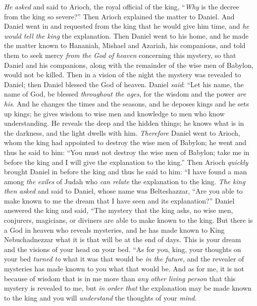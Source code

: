 \begin{biblechapter}
\verse \textit{He asked} and said to Arioch, the royal official of the king, “\textit{Why} is the decree from the king so severe?” Then Arioch explained the matter to Daniel.
\verse And Daniel went in and requested from the king that he would give him time, and \textit{he would tell the king} the explanation.
\verse Then Daniel went to his home, and he made the matter known to Hananiah, Mishael and Azariah, his companions,
\verse and told them to seek mercy \textit{from the God of heaven} concerning this mystery, so that Daniel and his companions, along with the remainder of the wise men of Babylon, would not be killed.
\verse Then in a vision of the night the mystery was revealed to Daniel; then Daniel blessed the God of heaven.
\verse Daniel \textit{said}:
\verse “Let his name, the name of God, be blessed \textit{throughout the ages}, 
for the wisdom and the power \textit{are his}.
\verse And he changes the times and the seasons, 
and he deposes kings and he sets up kings; 
he gives wisdom to wise men 
and knowledge to men who know understanding.
\verse He reveals the deep and the hidden things; 
he knows what is in the darkness, 
and the light dwells with him.
 \textit{Therefore} Daniel went to Arioch, whom the king had appointed to destroy the wise men of Babylon; he went and thus he said to him: “You must not destroy the wise men of Babylon; take me in before the king and I will give the explanation to the king.”
\verse Then Arioch \textit{quickly} brought Daniel in before the king and thus he said to him: “I have found a man among \textit{the exiles} of Judah who \textit{can relate} the explanation to the king.
\verse \textit{The king then asked} and said to Daniel, whose name was Belteshazzar, “Are you able to make known to me the dream that I have seen and its explanation?”
\verse Daniel answered the king and said, “The mystery that the king asks, no wise men, conjurers, magicians, or diviners are able to make known to the king.
\verse But there is a God in heaven who reveals mysteries, and he has made known to King Nebuchadnezzar what it is that will be at the end of days. This is your dream and the visions of your head on your bed.
\verse “As for you, king, your thoughts on your bed \textit{turned to} what it was that would be \textit{in the future}, and the revealer of mysteries has made known to you what that would be.
\verse And as for me, it is not because of wisdom that is in me more than \textit{any other living person} that this mystery is revealed to me, but \textit{in order that} the explanation may be made known to the king and you will \textit{understand} the thoughts of your \textit{mind}.

\end{biblechapter}
